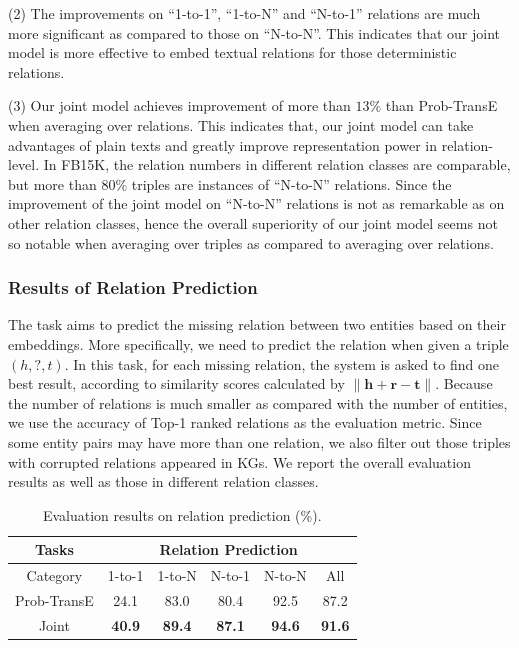 \documentclass[11pt,a4paper]{article}
\begin{document}
(2) The improvements on ``1-to-1'', ``1-to-N'' and ``N-to-1'' relations are much more significant as compared to those on ``N-to-N''. This indicates that our joint model is more effective to embed textual relations for those deterministic relations.

(3) Our joint model achieves improvement of more than $13\%$ than Prob-TransE when averaging over relations. This indicates that, our joint model can take advantages of plain texts and greatly improve representation power in relation-level. In FB15K, the relation numbers in different relation classes are comparable, but more than $80\%$ triples are instances of ``N-to-N'' relations. Since the improvement of the joint model on ``N-to-N'' relations is not as remarkable as on other relation classes, hence the overall superiority of our joint model seems not so notable when averaging over triples as compared to averaging over relations.

\subsubsection{Results of Relation Prediction}
The task aims to predict the missing relation between two entities based on their embeddings. More specifically, we need to predict the relation when given a triple $(h, ?, t)$. In this task, for each missing relation, the system is asked to find one best result, according to similarity scores calculated by $\lVert \textbf{h} + \textbf{r} - \textbf{t} \rVert$.
Because the number of relations is much smaller as compared with the number of entities, we use the accuracy of Top-1 ranked relations as the evaluation metric. Since some entity pairs may have more than one relation, we also filter out those triples with corrupted relations appeared in KGs. We report the overall evaluation results as well as those in different relation classes.

\begin{table}[htb]
\centering
\small 
\begin{tabular}{|c|c|c|c|c|c|}
\hline
Tasks             & \multicolumn{5}{c|}{Relation Prediction}                      \\ \hline
Category & 1-to-1     & 1-to-N     & N-to-1     & N-to-N     & All           \\ \hline
Prob-TransE       & 24.1       & 83.0       & 80.4       & 92.5       & 87.2          \\ \hline
Joint             & \textbf{40.9} & \textbf{89.4} & \textbf{87.1} & \textbf{94.6} & \textbf{91.6} \\ \hline
\end{tabular}
\caption{Evaluation results on relation prediction (\%).}
\label{t:relation}
\end{table}
\end{document}
